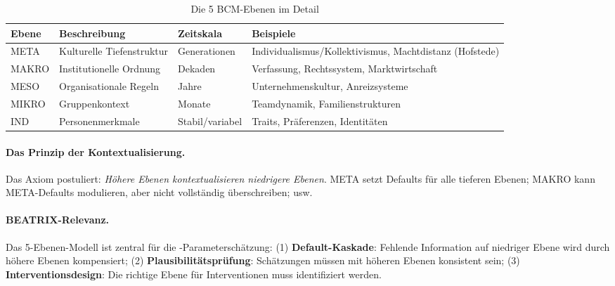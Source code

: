 \begin{table}[h]
\centering
\caption{Die 5 BCM-Ebenen im Detail}
\label{tab:ebenen_detail}
\begin{tabular}{@{}lp{3.5cm}p{3.5cm}p{4cm}@{}}
\toprule
\textbf{Ebene} & \textbf{Beschreibung} & \textbf{Zeitskala} & \textbf{Beispiele} \\
\midrule
META & Kulturelle Tiefenstruktur & Generationen & Individualismus/Kollektivismus, Machtdistanz (Hofstede) \\
MAKRO & Institutionelle Ordnung & Dekaden & Verfassung, Rechtssystem, Marktwirtschaft \\
MESO & Organisationale Regeln & Jahre & Unternehmenskultur, Anreizsysteme \\
MIKRO & Gruppenkontext & Monate & Teamdynamik, Familienstrukturen \\
IND & Personenmerkmale & Stabil/variabel & Traits, Präferenzen, Identitäten \\
\bottomrule
\end{tabular}
\end{table}

\paragraph{Das Prinzip der Kontextualisierung.}
Das Axiom postuliert: \textit{Höhere Ebenen kontextualisieren niedrigere Ebenen}. META setzt Defaults für alle tieferen Ebenen; MAKRO kann META-Defaults modulieren, aber nicht vollständig überschreiben; usw.

\paragraph{BEATRIX-Relevanz.}
Das 5-Ebenen-Modell ist zentral für die \BEATRIX-Parameterschätzung: (1) \textbf{Default-Kaskade}: Fehlende Information auf niedriger Ebene wird durch höhere Ebenen kompensiert; (2) \textbf{Plausibilitätsprüfung}: Schätzungen müssen mit höheren Ebenen konsistent sein; (3) \textbf{Interventionsdesign}: Die richtige Ebene für Interventionen muss identifiziert werden.

